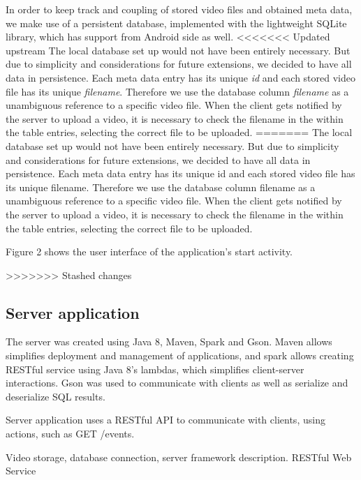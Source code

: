 \documentclass[conference]{IEEEtran}
\begin{document}
In order to keep track and coupling of stored video files and obtained meta data, we make use of a persistent database,
implemented with the lightweight SQLite library, which has support from Android side as well.
<<<<<<< Updated upstream
The local database set up would not have been entirely necessary. 
But due to simplicity and considerations for future extensions, we decided to have all data in persistence.
Each meta data entry has its unique \textsl{id} and each stored video file has its unique \textsl{filename}.
Therefore we use the database column \textsl{filename} as a unambiguous reference to a specific video file.
When the client gets notified by the server to upload a video, it is necessary to check the filename in the within 
the table entries, selecting the correct file to be uploaded.
=======
The local database set up would not have been entirely necessary. But due to simplicity and considerations for future extensions, we decided to have all data in persistence.
Each meta data entry has its unique id and each stored video file has its unique filename.
Therefore we use the database column filename as a unambiguous reference to a specific video file. When the client gets notified by the server to upload a video, it is necessary to check the filename in the within the table entries, selecting the correct file to be uploaded.

Figure 2 shows the user interface of the application's start activity. 

>>>>>>> Stashed changes

\subsection{Server application}


The server was created using Java 8, Maven, Spark and Gson. Maven allows simplifies deployment and management of applications,
and spark allows creating RESTful service using Java 8's lambdas, which simplifies client-server interactions.
Gson was used to communicate with clients as well as serialize and deserialize SQL results.

Server application uses a RESTful API to communicate with clients, using actions, such as GET /events.

Video storage, database connection, server framework description. RESTful Web Service
\end{document}

